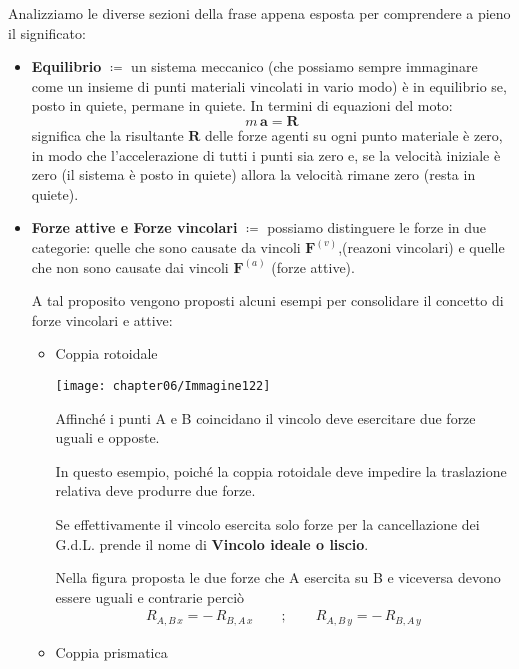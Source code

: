	Analizziamo le diverse sezioni della frase appena esposta per comprendere a pieno il significato:
	\begin{itemize}
	\item \textbf{Equilibrio} $\coloneqq$ un sistema meccanico (che possiamo sempre immaginare come un insieme di punti materiali vincolati in vario modo) è in equilibrio se, posto in quiete, permane in quiete. In termini di equazioni del moto:
	\[m\,\mathbf{a} = \mathbf{R}\]
	significa che la risultante $\mathbf{R}$ delle forze agenti su ogni punto materiale è zero, in modo che l'accelerazione di tutti i punti sia zero e, se la velocità iniziale è zero (il sistema è posto in quiete) allora la velocità rimane zero (resta in quiete). 
	\item \textbf{Forze attive e Forze vincolari} $\coloneqq$ possiamo distinguere le forze in due categorie: quelle che sono causate da vincoli $\mathbf{F}^{(v)}$,(reazoni vincolari) e quelle che non sono causate dai vincoli $\mathbf{F}^{(a)}$ (forze attive).
	
	A tal proposito vengono proposti alcuni esempi per consolidare il concetto di forze vincolari e attive:
	
	\begin{itemize}
	\item Coppia rotoidale
	
	\begin{minipage}{.4\textwidth}
	\centering
	\texttt{[image: chapter06/Immagine122]}
	\end{minipage}
	\hfill
	\begin{minipage}{.5\textwidth}
	Affinché i punti A e B coincidano il vincolo deve esercitare due forze uguali e opposte.
	
	In questo esempio, poiché la coppia rotoidale deve impedire la traslazione relativa deve produrre due forze.
	
	Se effettivamente il vincolo esercita solo forze per la cancellazione dei G.d.L. prende il nome di \textbf{Vincolo ideale o liscio}.
	
	Nella figura proposta le due forze che A esercita su B e viceversa devono essere uguali e contrarie perciò 
	\begin{gather*}
		R_{A,B\,x} = -\,R_{B,A\,x}\qquad;\qquad R_{A,B\,y} = -\,R_{B,A\,y}
	\end{gather*}
	\end{minipage}
	
			\item Coppia prismatica
			

\end{itemize}
\end{itemize}

